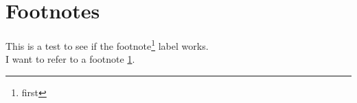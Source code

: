 \documentclass[12pt]{article}
\begin{document}
\section{Footnotes}

This is a test to see if the footnote\footnote{\label{test}first} label works.\\
I want to refer to a footnote \ref{test}. 
\end{document}
